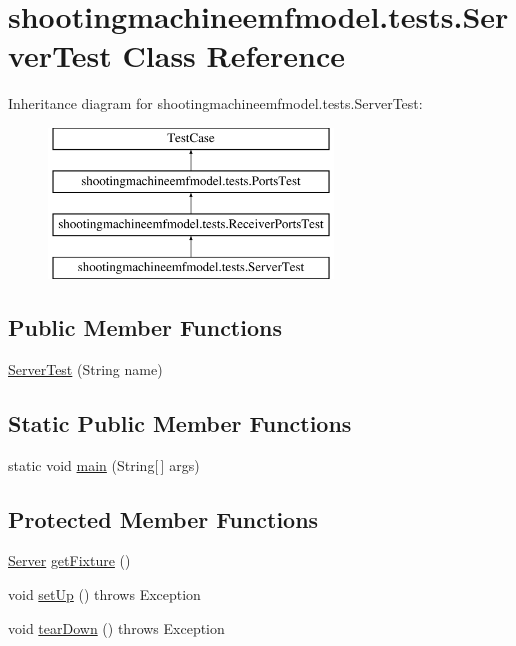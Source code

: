 \hypertarget{classshootingmachineemfmodel_1_1tests_1_1_server_test}{\section{shootingmachineemfmodel.\-tests.\-Server\-Test Class Reference}
\label{classshootingmachineemfmodel_1_1tests_1_1_server_test}
}
Inheritance diagram for shootingmachineemfmodel.\-tests.\-Server\-Test\-:\begin{figure}[H]
\begin{center}
\leavevmode
\includegraphics[height=4.000000cm]{classshootingmachineemfmodel_1_1tests_1_1_server_test}
\end{center}
\end{figure}
\subsection*{Public Member Functions}
\begin{DoxyCompactItemize}
\item 
\hyperlink{classshootingmachineemfmodel_1_1tests_1_1_server_test_a1d6586f4679a08f399d137534fc32425}{Server\-Test} (String name)
\end{DoxyCompactItemize}
\subsection*{Static Public Member Functions}
\begin{DoxyCompactItemize}
\item 
static void \hyperlink{classshootingmachineemfmodel_1_1tests_1_1_server_test_a995cb0c309028e3deb44be8b2ba51b9c}{main} (String\mbox{[}$\,$\mbox{]} args)
\end{DoxyCompactItemize}
\subsection*{Protected Member Functions}
\begin{DoxyCompactItemize}
\item 
\hyperlink{interfaceshootingmachineemfmodel_1_1_server}{Server} \hyperlink{classshootingmachineemfmodel_1_1tests_1_1_server_test_a3ec629ea127653c2a84c667edd4f3b45}{get\-Fixture} ()
\item 
void \hyperlink{classshootingmachineemfmodel_1_1tests_1_1_server_test_afeba36dc0286f48748e97c1e8a158263}{set\-Up} ()  throws Exception 
\item 
void \hyperlink{classshootingmachineemfmodel_1_1tests_1_1_server_test_a83f4cf03bf0bc68e9b86b6576bd4c813}{tear\-Down} ()  throws Exception 
\end{DoxyCompactItemize}
